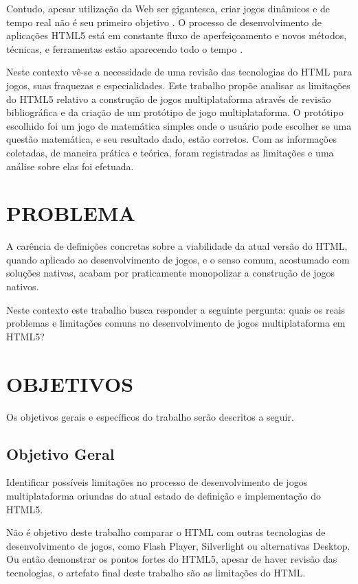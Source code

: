 Contudo, apesar utilização da Web ser gigantesca, criar
jogos dinâmicos e de tempo real não é seu primeiro objetivo
\autocite{html5mostwanted}. O processo de desenvolvimento de
aplicações HTML5 está em constante fluxo de aperfeiçoamento e novos
métodos, técnicas, e ferramentas estão aparecendo todo o tempo
\autocite{crossPlatformMobileGame}.

Neste contexto vê-se a necessidade de uma revisão das tecnologias do
HTML para jogos, suas fraquezas e especialidades. Este trabalho propõe
analisar as limitações do HTML5 relativo a construção de jogos
multiplataforma através de revisão bibliográfica e da criação de um
protótipo de jogo multiplataforma. O protótipo escolhido foi um jogo
de matemática simples onde o usuário pode escolher se uma questão
matemática, e seu resultado dado, estão corretos. Com as informações
coletadas, de maneira prática e teórica, foram registradas as limitações
e uma análise sobre elas foi efetuada.

\section{PROBLEMA}
A carência de definições concretas sobre a viabilidade da atual
versão do HTML, quando aplicado ao desenvolvimento de jogos, e o senso
comum, acostumado com soluções nativas, acabam por praticamente
monopolizar a construção de jogos nativos.

Neste contexto este trabalho busca responder a seguinte pergunta: quais os
reais problemas e limitações comuns no desenvolvimento de jogos
multiplataforma em HTML5?

\section{OBJETIVOS}

Os objetivos gerais e específicos do trabalho serão descritos a seguir.

\subsection{Objetivo Geral}

Identificar possíveis limitações no processo de desenvolvimento
de jogos multiplataforma oriundas do atual estado de definição e
implementação do HTML5.

Não é objetivo deste trabalho comparar o HTML com outras tecnologias
de desenvolvimento de jogos, como Flash Player, Silverlight ou
alternativas Desktop. Ou então demonstrar os pontos fortes do HTML5,
apesar de haver revisão das tecnologias, o artefato final deste
trabalho são as limitações do HTML.

